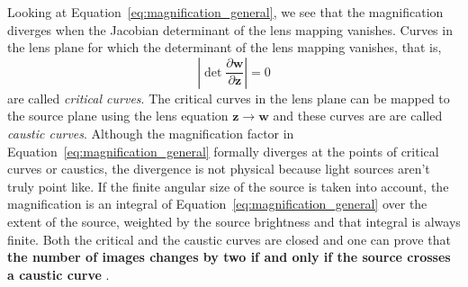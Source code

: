 \documentclass[12pt,dvipsnames]{report}
\begin{document}
Looking at Equation~\ref{eq:magnification_general}, we see that the
magnification diverges when the Jacobian determinant of the lens mapping
vanishes. Curves in the lens plane for which the determinant of the lens
mapping vanishes, that is,
\begin{equation}
    \left\lvert\det
    \frac{\partial \mathbf w}{\partial \mathbf z} \right\rvert=0
\end{equation}
are called \emph{critical curves}.
The critical curves in the lens plane can be mapped to the source plane using
the lens equation $\mathbf{z}\rightarrow \mathbf{w}$ and these curves are
are called \emph{caustic curves}.
Although the magnification factor in Equation~\ref{eq:magnification_general} formally
diverges at the points of critical curves or caustics,
the divergence is not physical because light sources aren't truly point like.
If the finite angular size of the source is taken into
account, the magnification is an integral of Equation~\ref{eq:magnification_general} over the
extent of the source, weighted by the source brightness and that integral is always finite.
Both the critical and the caustic curves are closed and one can prove that \textbf{the
    number of images changes by two if and only if the source crosses a caustic curve}
\citep[][Chapter 6]{1992grle.book.....S}.
\end{document}
